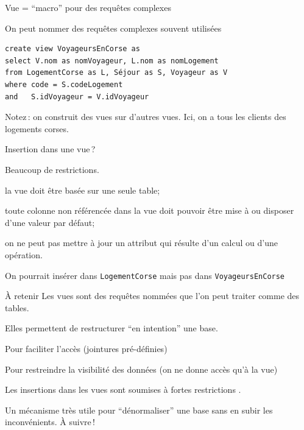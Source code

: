 \begin{frame}[fragile]{Vue = ``macro'' pour des requêtes complexes}

On peut nommer des requêtes complexes souvent utilisées

\vfill

\begin{verbatim}
create view VoyageursEnCorse as
select V.nom as nomVoyageur, L.nom as nomLogement
from LogementCorse as L, Séjour as S, Voyageur as V
where code = S.codeLogement
and   S.idVoyageur = V.idVoyageur
\end{verbatim}

\vfill

Notez\,: on construit des vues sur d'autres vues. Ici, on a tous
les clients des logements corses.
\end{frame}


\begin{frame}[fragile]{Insertion dans une vue\,?}

Beaucoup de restrictions.


\vfill
\begin{redbullet}
  \item la vue doit être basée sur une seule table;
   \item toute colonne non référencée
    dans la vue doit pouvoir être mise à 
     ou disposer d'une valeur par défaut;
  \item on ne peut pas mettre à jour un attribut
    qui résulte d'un calcul ou d'une opération.
\end{redbullet}

\vfill

On pourrait insérer dans \texttt{LogementCorse} mais pas dans \texttt{VoyageursEnCorse}

\end{frame}

\begin{frame}{À retenir}
Les \alert{vues} sont des requêtes nommées que l'on peut traiter
comme des tables.

\vfill

Elles permettent de restructurer ``en intention''  une base.

\begin{redbullet}
   \item  Pour faciliter l'accès (jointures pré-définies)
   \item Pour restreindre la visibilité des données (on ne donne accès qu'à la vue)
   \item Les insertions dans les vues sont soumises à fortes restrictions .
\end{redbullet}
\vfill

Un mécanisme très utile pour ``dénormaliser'' une base sans en subir les inconvénients. À suivre\,!

\end{frame}

